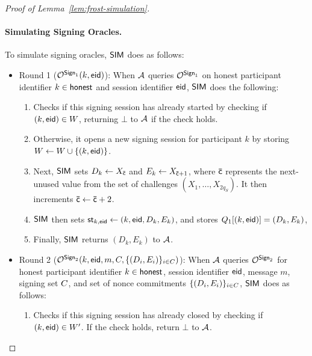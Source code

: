 \begin{proof}[Proof of Lemma~\ref{lem:frost-simulation}]
  \medskip


	\smallskip

  \paragraph{Simulating Signing Oracles.}
  To simulate signing oracles,
  $\mathsf{SIM}$ does as follows:

  \begin{itemize}
    \item{Round 1 ($\mathcal{O}^{\mathsf{Sign}_1}(k, \mathsf{eid})$):}
	When $\mathcal{A}$ queries $\mathcal{O}^{\mathsf{Sign}_1}$ on honest participant identifier $k \in \mathsf{honest}$ and session identifier $\mathsf{eid}$,
  $\mathsf{SIM}$ does the following:
  \begin{enumerate}
  \item Checks if this signing session has already started by checking if $(k, \mathsf{eid}) \in W$,
  returning $\bot$ to $\mathcal{A}$ if the check holds.
  \item Otherwise, it opens a new signing session for participant $k$ by storing $W \gets W \cup \{(k, \mathsf{eid}) \} $.
  \item Next, $\mathsf{SIM}$ sets $D_k \gets X_{\mathsf{\bar{c}}}$ and $E_k \gets X_{\mathsf{\bar{c}}+1}$,
  where $\mathsf{\bar{c}}$ represents the next-unused value from the set of challenges $(X_1, \ldots, X_{2 q_S})$.
  It then increments $\mathsf{\bar{c}} \gets \mathsf{\bar{c}} + 2$.
  \item $\mathsf{SIM}$ then sets $\mathsf{st}_{k,\mathsf{eid}} \gets (k, \mathsf{eid}, D_k, E_k)$,
  and stores $Q_1[(k, \mathsf{eid})] = (D_k, E_k)$,
  \item Finally, $\mathsf{SIM}$ returns $(D_k, E_k)$ to $\mathcal{A}$.
  \end{enumerate}

\item{Round 2 ($\mathcal{O}^{\mathsf{Sign}_2}(k, \mathsf{eid}, m, C, \{ (D_i, E_i) \}_{i \in C})$):}
	When $\mathcal{A}$ queries $\mathcal{O}^{\mathsf{Sign}_2}$ for honest participant identifier $k \in \mathsf{honest}$,
  session identifier $\mathsf{eid}$, message $m$, signing set $C$,
  and set of nonce commitments $\{ (D_i, E_i) \}_{i \in C}$,
  $\mathsf{SIM}$ does as follows:
  \begin{enumerate}
  \item Checks if this signing session has already closed by checking if $(k, \mathsf{eid}) \in W'$.
    If the check holds,
    return $\bot$ to $\mathcal{A}$.


\end{enumerate}
\end{itemize}
\end{proof}
